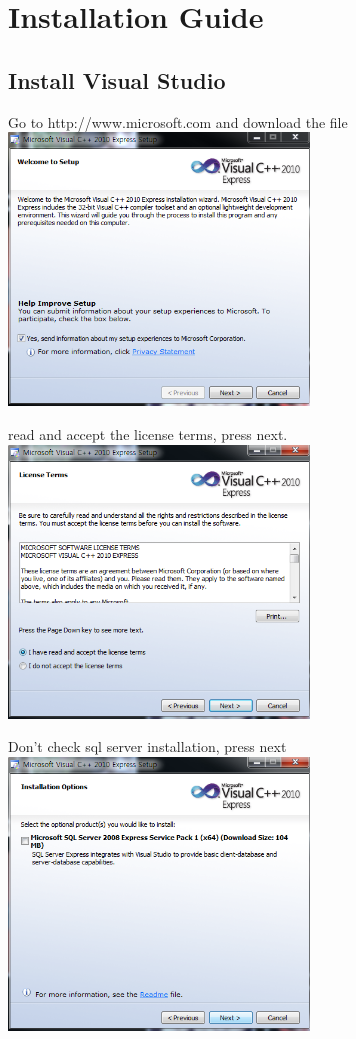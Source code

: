 \documentclass[12pt]{article}
\begin{document}
\newpage\section{Installation Guide}
\subsection{Install Visual Studio}
\begin{center}
Go to  http://www.microsoft.com and download the file\\ [1\baselineskip]
\includegraphics[width=80mm,scale=1.3]{visual1}
\end{center}

\begin{center}
read and accept the license terms, press next. \\ [1\baselineskip]
\includegraphics[width=80mm,scale=1.3]{visual2}
\end{center}
\newpage
\begin{center}
Don't check sql server installation, press next\\ [1\baselineskip]
\includegraphics[width=80mm,scale=1.3]{visual3}
\end{center}
\end{document}

